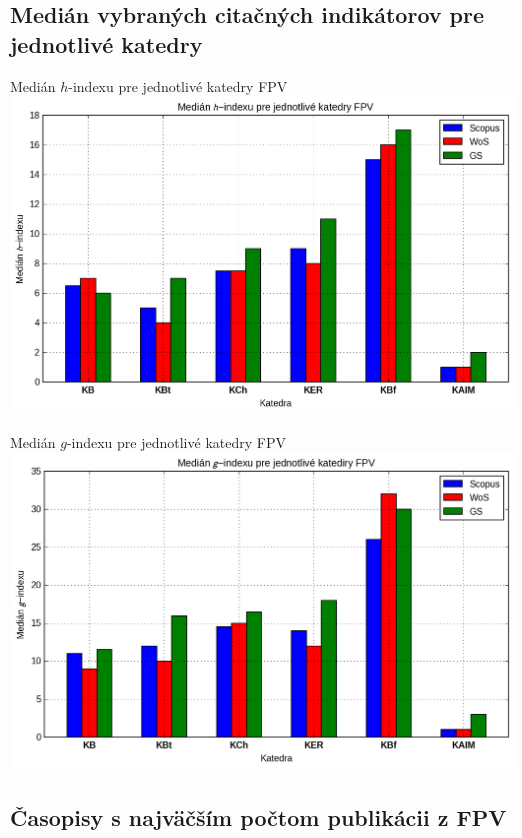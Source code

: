 \documentclass{beamer}
\begin{document}
\subsection{Medián vybraných citačných indikátorov pre jednotlivé katedry}
%
%
\begin{frame}{Medián $h$-indexu pre jednotlivé katedry FPV}
  \includegraphics[scale=0.5]{plot-results-data-h_index.png}
\end{frame}

%
%
\begin{frame}{Medián $g$-indexu pre jednotlivé katedry FPV}
  \includegraphics[scale=0.499]{plot-results-data-g_index.png}
\end{frame}

\subsection{Časopisy s najväčším počtom publikácii z FPV}
\end{document}

